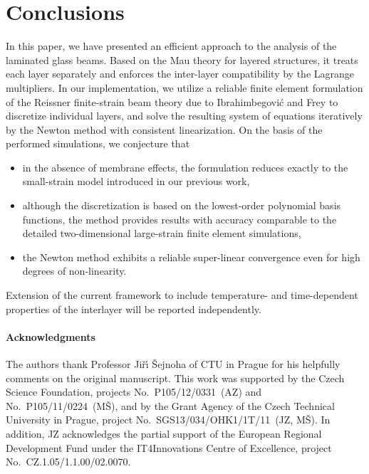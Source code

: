 \documentclass[11pt]{article}
\begin{document}
\section{Conclusions}\label{sec:conclusions}
In this paper, we have presented an efficient approach to the analysis of the
laminated glass beams. Based on the Mau theory for layered structures, it treats
each layer separately and enforces the inter-layer compatibility by the Lagrange
multipliers. In our implementation, we utilize a reliable finite element
formulation of the Reissner finite-strain beam theory due to Ibrahimbegovi\'{c}
and Frey to discretize individual layers, and solve the resulting system of
equations iteratively by the Newton method with consistent linearization. On the
basis of the performed simulations, we conjecture that

\begin{itemize}
  \item in the absence of membrane effects, the formulation reduces exactly to
  the small-strain model introduced in our previous work, 
  \item although the discretization is based on the lowest-order polynomial
  basis functions, the method provides results with accuracy comparable to
  the detailed two-dimensional large-strain finite element simulations, 
  \item the Newton method exhibits a reliable super-linear convergence even for
  high degrees of non-linearity. 
\end{itemize}

Extension of the current framework to include temperature- and time-dependent
properties of the interlayer will be reported independently.

\paragraph{Acknowledgments}
The authors thank Professor Ji\v{r}\'{\i} \v{S}ejnoha of CTU in Prague
for his helpfully comments on the original manuscript. This work was supported by
the Czech Science Foundation, projects No.~P105/12/0331~(AZ) and
No.~P105/11/0224~(M\v{S}), and by the Grant Agency of the Czech Technical
University in Prague, project No.~SGS13/034/OHK1/1T/11~(JZ, M\v{S}). In
addition, JZ acknowledges the partial support of the European Regional
Development Fund under the IT4Innovations Centre of Excellence, project
No.~CZ.1.05/1.1.00/02.0070.

\providecommand{\bysame}{\leavevmode\hbox to3em{\hrulefill}\thinspace}
\end{document}
